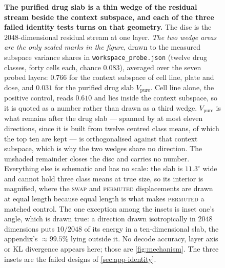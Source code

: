 \begin{figure}[htbp]
\begin{fullwidth}
\caption[The drug slab and the context subspace, by variance
share]{\textbf{The purified drug slab is a thin wedge of the residual stream
beside the context subspace, and each of the three failed identity tests turns
on that geometry.} The disc is the
$2048$-dimensional residual stream at one layer. \emph{The two wedge areas are
the only scaled marks in the figure}, drawn to the measured subspace variance
shares in \texttt{workspace\_probe.json} (twelve drug classes, forty cells
each, chance $0.083$), averaged over the seven probed layers: $0.766$ for the
context subspace of cell line, plate and dose, and $0.031$ for the purified
drug slab $V_{\mathrm{pure}}$. Cell line alone, the positive control, reads
$0.610$ and lies inside the context subspace, so it is quoted as a number
rather than drawn as a third wedge. $V_{\mathrm{pure}}$ is what remains after
the drug slab --- spanned by at most eleven directions, since it is built from
twelve centred class means, of which the top ten are kept --- is orthogonalised
against that context subspace, which is why the two wedges share no direction.
The unshaded remainder closes the disc and carries no number. Everything else
is schematic and has no scale: the slab is $11.3^{\circ}$ wide and cannot hold
three class means at true size, so its interior is magnified, where the
\textsc{swap} and \textsc{permuted} displacements are drawn at equal length
because equal length is what makes \textsc{permuted} a matched control. The one
exception among the insets is inset one's angle, which is drawn true: a
direction drawn isotropically in $2048$ dimensions puts $10/2048$ of its energy
in a ten-dimensional slab, the appendix's $\approx 99.5\%$ lying outside it. No
decode accuracy, layer axis or KL divergence appears here; those are
\cref{fig:mechanism}. The three insets are the failed designs of
\cref{sec:app-identity}.}
\label{fig:slab}
\end{fullwidth}
\end{figure}

